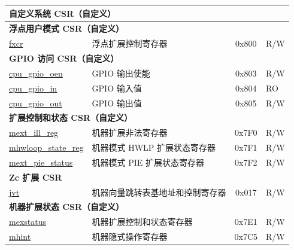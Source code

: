 \begin{longtable}{ | p{4.0cm} | p{8.4cm} | c | l | }
\multicolumn{4}{|l|}{\textbf{自定义系统 CSR（自定义）}} \\\hline
\multicolumn{4}{|l|}{\textbf{浮点用户模式 CSR（自定义）}} \\\hline
\hyperref[regdesc:FXCR]{fxcr} & 浮点扩展控制寄存器 & 0x800 & R/W \\\hline
\multicolumn{4}{|l|}{\textbf{GPIO 访问 CSR（自定义）}} \\\hline
\hyperref[regdesc:GPIO_OEN]{cpu\_gpio\_oen} & GPIO 输出使能 & 0x803 & R/W \\\hline
\hyperref[regdesc:GPIO_IN]{cpu\_gpio\_in} & GPIO 输入值 & 0x804 & RO \\\hline
\hyperref[regdesc:GPIO_OUT]{cpu\_gpio\_out} & GPIO 输出值 & 0x805 & R/W \\\hline
\multicolumn{4}{|l|}{\textbf{扩展控制和状态 CSR（自定义）}} \\\hline
\hyperref[sec:riscvcpu-hwloop-reg-desc]{mext\_ill\_reg} & 机器扩展非法寄存器 & 0x7F0 & R/W \\\hline
\hyperref[sec:riscvcpu-hwloop-reg-desc]{mhwloop\_state\_reg} & 机器模式 HWLP 扩展状态寄存器 & 0x7F1 & R/W \\\hline
\hyperref[regdesc:MEXT_PIE_STATUS]{mext\_pie\_status} & 机器模式 PIE 扩展状态寄存器 & 0x7F2 & R/W \\\hline

\multicolumn{4}{|l|}{\textbf{Zc 扩展 CSR}} \\\hline
\hyperref[regdesc:JVT]{jvt} & 机器向量跳转表基地址和控制寄存器 & 0x017 & R/W \\\hline
\multicolumn{4}{|l|}{\textbf{机器扩展状态 CSR（自定义）}} \\\hline
\hyperref[regdesc:MEXSTATUS]{mexstatus} & 机器扩展控制和状态寄存器 & 0x7E1 & R/W \\\hline
\hyperref[regdesc:MHINT]{mhint} & 机器隐式操作寄存器 & 0x7C5 & R/W \\\hline


\end{longtable}
